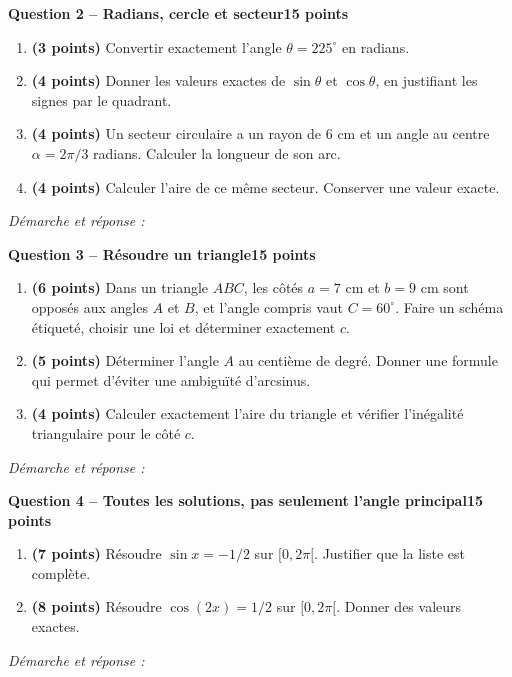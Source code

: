 \documentclass[11pt,a4paper]{article}
\begin{document}
\newpage
{\large\bfseries Question 2 -- Radians, cercle et secteur}\hfill\textbf{15 points}\par
\begin{enumerate}
\item \textbf{(3 points)} Convertir exactement l’angle \(\theta=225^\circ\) en radians.
\item \textbf{(4 points)} Donner les valeurs exactes de \(\sin\theta\) et \(\cos\theta\), en justifiant les signes par le quadrant.
\item \textbf{(4 points)} Un secteur circulaire a un rayon de 6 cm et un angle au centre \(\alpha=2\pi/3\) radians. Calculer la longueur de son arc.
\item \textbf{(4 points)} Calculer l’aire de ce même secteur. Conserver une valeur exacte.
\end{enumerate}
\vspace{3mm}\textit{Démarche et réponse :}\par\vfill

\newpage
{\large\bfseries Question 3 -- Résoudre un triangle}\hfill\textbf{15 points}\par
\begin{enumerate}
\item \textbf{(6 points)} Dans un triangle \(ABC\), les côtés \(a=7\) cm et \(b=9\) cm sont opposés aux angles \(A\) et \(B\), et l’angle compris vaut \(C=60^\circ\). Faire un schéma étiqueté, choisir une loi et déterminer exactement \(c\).
\item \textbf{(5 points)} Déterminer l’angle \(A\) au centième de degré. Donner une formule qui permet d’éviter une ambiguïté d’arcsinus.
\item \textbf{(4 points)} Calculer exactement l’aire du triangle et vérifier l’inégalité triangulaire pour le côté \(c\).
\end{enumerate}
\vspace{3mm}\textit{Démarche et réponse :}\par\vfill

\newpage
{\large\bfseries Question 4 -- Toutes les solutions, pas seulement l’angle principal}\hfill\textbf{15 points}\par
\begin{enumerate}
\item \textbf{(7 points)} Résoudre \(\sin x=-1/2\) sur \([0,2\pi[\). Justifier que la liste est complète.
\item \textbf{(8 points)} Résoudre \(\cos(2x)=1/2\) sur \([0,2\pi[\). Donner des valeurs exactes.
\end{enumerate}
\vspace{3mm}\textit{Démarche et réponse :}\par\vfill
\end{document}
